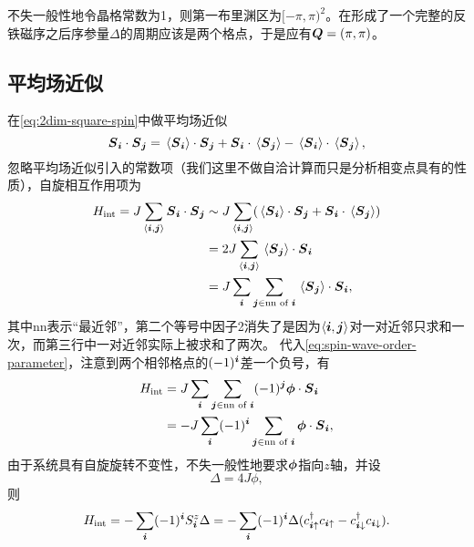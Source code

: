 不失一般性地令晶格常数为1，则第一布里渊区为$[-\pi, \pi)^2$。在形成了一个完整的反铁磁序之后序参量$\Delta$的周期应该是两个格点，于是应有$\vb*{Q}=(\pi, \pi)$。

\subsection{平均场近似}

在\eqref{eq:2dim-square-spin}中做平均场近似
\begin{equation}
    \vb*{{S}}_{\vb*{i}} \cdot \vb*{{S}}_{\vb*{j}} = \expval*{\vb*{{S}}_{\vb*{i}}} \cdot \vb*{{S}}_{\vb*{j}} + \vb*{{S}}_{\vb*{i}} \cdot \expval*{\vb*{{S}}_{\vb*{j}}} - \expval*{\vb*{{S}}_{\vb*{i}}} \cdot \expval*{\vb*{{S}}_{\vb*{j}}},
\end{equation}
忽略平均场近似引入的常数项（我们这里不做自洽计算而只是分析相变点具有的性质），自旋相互作用项为
\[
    \begin{aligned}
        {H}_\text{int} = J \sum_{\langle \vb*{i}, \vb*{j} \rangle} {\vb*{S}}_{\vb*{i}} \cdot {\vb*{S}}_{\vb*{j}} &\sim J \sum_{\langle \vb*{i}, \vb*{j} \rangle} (\expval*{\vb*{{S}}_{\vb*{i}}} \cdot \vb*{{S}}_{\vb*{j}} + \vb*{{S}}_{\vb*{i}} \cdot \expval*{\vb*{{S}}_{\vb*{j}}}) \\
        &= 2 J \sum_{\langle \vb*{i}, \vb*{j} \rangle} \expval*{\vb*{{S}}_{\vb*{j}}} \cdot \vb*{{S}}_{\vb*{i}} \\
        &= J \sum_{\vb*{i}} \sum_{\vb*{j} \in \text{nn of } \vb*{i}} \expval*{\vb*{{S}}_{\vb*{j}}} \cdot \vb*{{S}}_{\vb*{i}},
    \end{aligned}
\]
其中nn表示“最近邻”，第二个等号中因子2消失了是因为$\langle \vb*{i}, \vb*{j} \rangle$对一对近邻只求和一次，而第三行中一对近邻实际上被求和了两次。
代入\eqref{eq:spin-wave-order-parameter}，注意到两个相邻格点的$(-1)^{\vb*{i}}$差一个负号，有
\[
    \begin{aligned}
        {H}_\text{int} &= J \sum_{\vb*{i}} \sum_{\vb*{j} \in \text{nn of } \vb*{i}} (-1)^{\vb*{j}} \vb*{\phi} \cdot \vb*{{S}}_{\vb*{i}} \\
        &= - J \sum_{\vb*{i}} (-1)^{\vb*{i}} \sum_{\vb*{j} \in \text{nn of } \vb*{i}} \vb*{\phi} \cdot \vb*{{S}}_{\vb*{i}},
    \end{aligned}
\]
由于系统具有自旋旋转不变性，不失一般性地要求$\vb*{\phi}$指向$z$轴，并设
\begin{equation}
    \Delta = 4 J \phi,
\end{equation}
则
\begin{equation}
    {H}_\text{int} = - \sum_{\vb*{i}} (-1)^{\vb*{i}} {S}_{\vb*{i}}^z \Delta = - \sum_{\vb*{i}} (-1)^{\vb*{i}} \Delta ({c}_{\vb*{i} \uparrow}^\dagger {c}_{\vb*{i} \uparrow} - {c}_{\vb*{i} \downarrow}^\dagger {c}_{\vb*{i} \downarrow}).
\end{equation}
